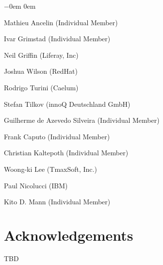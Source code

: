 \begin{list}{$-$}{\parsep 0em  0em}
\item Mathieu Ancelin (Individual Member)
\item Ivar Grimstad (Individual Member)
\item Neil Griffin (Liferay, Inc)
\item Joshua Wilson (RedHat)
\item Rodrigo Turini (Caelum)
\item Stefan Tilkov (innoQ Deutschland GmbH)
\item Guilherme de Azevedo Silveira (Individual Member)
\item Frank Caputo (Individual Member)
\item Christian Kaltepoth (Individual Member)
\item Woong-ki Lee (TmaxSoft, Inc.)
\item Paul Nicolucci (IBM)
\item Kito D. Mann (Individual Member)
\end{list}

\section{Acknowledgements}
\label{acks}

TBD
